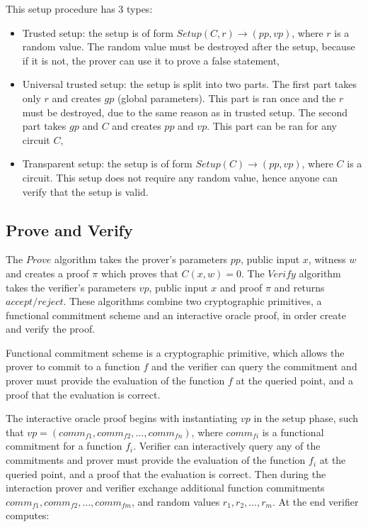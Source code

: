 This setup procedure has 3 types:

\begin{itemize}
    \item Trusted setup: the setup is of form $Setup(C, r) \rightarrow (pp, vp)$,
          where $r$ is a random value. The random value must be destroyed after
          the setup, because if it is not, the prover can use it to prove a false
          statement,
    \item Universal trusted setup: the setup is split into two parts. The first
          part takes only $r$ and creates $gp$ (global parameters). This part
          is ran once and the $r$ must be destroyed, due to the same reason as
          in trusted setup. The second part takes $gp$ and $C$ and creates
          $pp$ and $vp$. This part can be ran for any circuit $C$,
    \item Transparent setup: the setup is of form $Setup(C) \rightarrow (pp, vp)$,
          where $C$ is a circuit. This setup does not require any random value,
          hence anyone can verify that the setup is valid.
\end{itemize}

\subsection{Prove and Verify}

The $Prove$ algorithm takes the prover's parameters $pp$, public input $x$,
witness $w$ and creates a proof $\pi$ which proves that $C(x, w) = 0$.
The $Verify$ algorithm takes the verifier's parameters $vp$, public input $x$ and
proof $\pi$ and returns $accept/reject$. These algorithms combine two
cryptographic primitives, a functional commitment scheme and an interactive
oracle proof, in order create and verify the proof.

Functional commitment scheme is a cryptographic primitive, which allows the
prover to commit to a function $f$ and the verifier can query the commitment and
prover must provide the evaluation of the function $f$ at the queried point,
and a proof that the evaluation is correct.

The interactive oracle proof begins with instantiating $vp$ in the setup phase, such that
$vp = (comm_{f1}, comm_{f2}, \dots, comm_{fn})$, where $comm_{fi}$ is a
functional commitment for a function $f_i$. Verifier can interactively query
any of the commitments and prover must provide the evaluation of the function
$f_i$ at the queried point, and a proof that the evaluation is correct.
Then during the interaction prover and verifier exchange additional function
commitments $comm_{f1}, comm_{f2}, \dots, comm_{fm}$, and random values $r_1, r_2, \dots, r_m$.
At the end verifier computes:

